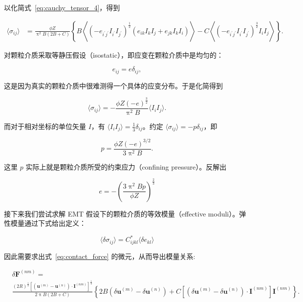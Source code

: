 以化简式~\eqref{eq:cauchy_tensor_4}，得到

\begin{equation}
  \begin{aligned}
    \langle\sigma_{ij}\rangle &= \frac{\phi Z}{\uppi^{2}B(2B+C)}\left\{B\left\langle(-e_{i^{\prime}j^{\prime}}I_{i^{\prime}}I_{j^{\prime}})^{\frac{1}{2}}(e_{ik}I_{k}I_{j} + e_{jk}I_{k}I_{i})\right\rangle - C\left\langle(-e_{i^{\prime}j^{\prime}}I_{i^{\prime}}I_{j^{\prime}})^{\frac{3}{2}}I_{i}I_{j}\right\rangle\right\}.
  \end{aligned}\label{eq:cauchy_tensor_end}
\end{equation}

对颗粒介质采取等静压假设（isostatic），即应变在颗粒介质中是均匀的：

\begin{equation}
  e_{ij} = e\delta_{ij},
\end{equation}

这是因为真实的颗粒介质中很难测得一个具体的应变分布。于是化简得到

\begin{equation}
  \langle\sigma_{ij}\rangle = -\frac{\phi Z(-e)^{\frac{3}{2}}}{\uppi^{2}B}\langle I_{i}I_{j}\rangle.\label{eq:expected_value}
\end{equation}

而对于相对坐标的单位矢量 $I$，有 $\langle I_{i}I_{j}\rangle = \frac{1}{3}\delta_{ij}$。约定 $\langle\sigma_{ij}\rangle = -p\delta_{ij}$，即

\begin{equation}
  p = \frac{\phi Z(-e)^{3/2}}{3\uppi^{2}B}.
\end{equation}

这里 $p$ 实际上就是颗粒介质所受的约束应力（confining pressure）。反解出

\begin{equation}
  e = -\left(\frac{3\uppi^{2}Bp}{\phi Z}\right)^{\frac{2}{3}}
\end{equation}

接下来我们尝试求解 EMT 假设下的颗粒介质的等效模量（effective moduli）。弹性模量通过下式给出定义：

\begin{equation}
  \langle\delta\sigma_{ij}\rangle = C_{ijkl}^{*}\langle\delta e_{kl}\rangle\label{eq:modulus_definition}
\end{equation}

因此需要求出式~\eqref{eq:contact_force} 的微元，从而导出模量关系:

\begin{equation}
  \begin{aligned}
  &\delta\mathbf{F}^{(nm)} =\\
  &\frac{(2R)^{\frac{1}{2}}\left[\left(\mathbf{u}^{(m)} - \mathbf{u}^{(n)}\right)\cdot\mathbf{I}^{(nm)}\right]^{\frac{1}{2}}}{2\uppi B(2B+C)}\left\{2B\left(\delta\mathbf{u}^{(m)} - \delta\mathbf{u}^{(n)}\right) + C\left[\left(\delta\mathbf{u}^{(m)} - \delta\mathbf{u}^{(n)}\right)\cdot\mathbf{I}^{(nm)}\right]\mathbf{I}^{(nm)}\right\}.
  \end{aligned}
\end{equation}

